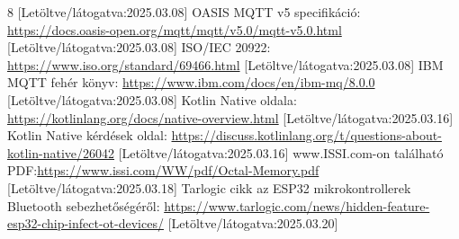 \documentclass{thesis-ekf}
\theoremstyle{definition}
\theoremstyle{remark}
\begin{document}
\begin{thebibliography}{8}
	[Letöltve/látogatva:2025.03.08]
	OASIS MQTT v5 specifikáció: \url{https://docs.oasis-open.org/mqtt/mqtt/v5.0/mqtt-v5.0.html}
	[Letöltve/látogatva:2025.03.08]
	 ISO/IEC 20922: \url{https://www.iso.org/standard/69466.html}
	[Letöltve/látogatva:2025.03.08]
	 IBM MQTT fehér könyv: \url{https://www.ibm.com/docs/en/ibm-mq/8.0.0}
	[Letöltve/látogatva:2025.03.08]
	 Kotlin Native oldala: \url{https://kotlinlang.org/docs/native-overview.html}
	[Letöltve/látogatva:2025.03.16]
	 Kotlin Native kérdések oldal: \url{https://discuss.kotlinlang.org/t/questions-about-kotlin-native/26042}
	[Letöltve/látogatva:2025.03.16]
	 www.ISSI.com-on található PDF:\url{https://www.issi.com/WW/pdf/Octal-Memory.pdf}
	 [Letöltve/látogatva:2025.03.18]
	 Tarlogic cikk az ESP32 mikrokontrollerek Bluetooth sebezhetőségéről: \url{https://www.tarlogic.com/news/hidden-feature-esp32-chip-infect-ot-devices/}
	[Letöltve/látogatva:2025.03.20]
\end{thebibliography}
\end{document}
